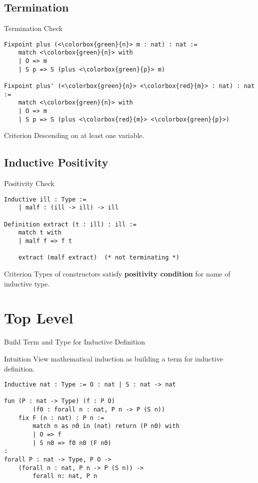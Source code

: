 \documentclass[UTF-8]{beamer}
\begin{document}
\subsection{Termination}
\begin{frame}[fragile]{Termination Check}
\begin{verbatim}
Fixpoint plus (<\colorbox{green}{n}> m : nat) : nat :=
    match <\colorbox{green}{n}> with
    | O => m
    | S p => S (plus <\colorbox{green}{p}> m)

Fixpoint plus' (<\colorbox{green}{n}> <\colorbox{red}{m}> : nat) : nat :=
    match <\colorbox{green}{n}> with
    | O => m
    | S p => S (plus <\colorbox{red}{m}> <\colorbox{green}{p}>)
\end{verbatim}
\begin{alertblock}{Criterion}
    Descending on at least one variable.
\end{alertblock}
\end{frame}

\subsection{Inductive Positivity}
\begin{frame}[fragile]{Positivity Check}
\begin{verbatim}
Inductive ill : Type :=
    | malf : (ill -> ill) -> ill 

Definition extract (t : ill) : ill :=
    match t with
    | malf f => f t

    extract (malf extract)  (* not terminating *)
\end{verbatim}
\begin{alertblock}{Criterion}
    Types of constructors satisfy \textbf{positivity condition} for name of inductive type.
\end{alertblock}
\end{frame}

\section{Top Level}
\begin{frame}[fragile]{Build Term and Type for Inductive Definition}
\begin{exampleblock}{Intuition}
    View mathematical induction as building a term for inductive definition.
\end{exampleblock}

\begin{verbatim}
Inductive nat : Type := O : nat | S : nat -> nat

fun (P : nat -> Type) (f : P O) 
        (f0 : forall n : nat, P n -> P (S n)) 
    fix F (n : nat) : P n :=
        match n as n0 in (nat) return (P n0) with
        | O => f
        | S n0 => f0 n0 (F n0)
:
forall P : nat -> Type, P O -> 
    (forall n : nat, P n -> P (S n)) -> 
        forall n: nat, P n
\end{verbatim}
\end{frame}
\end{document}
